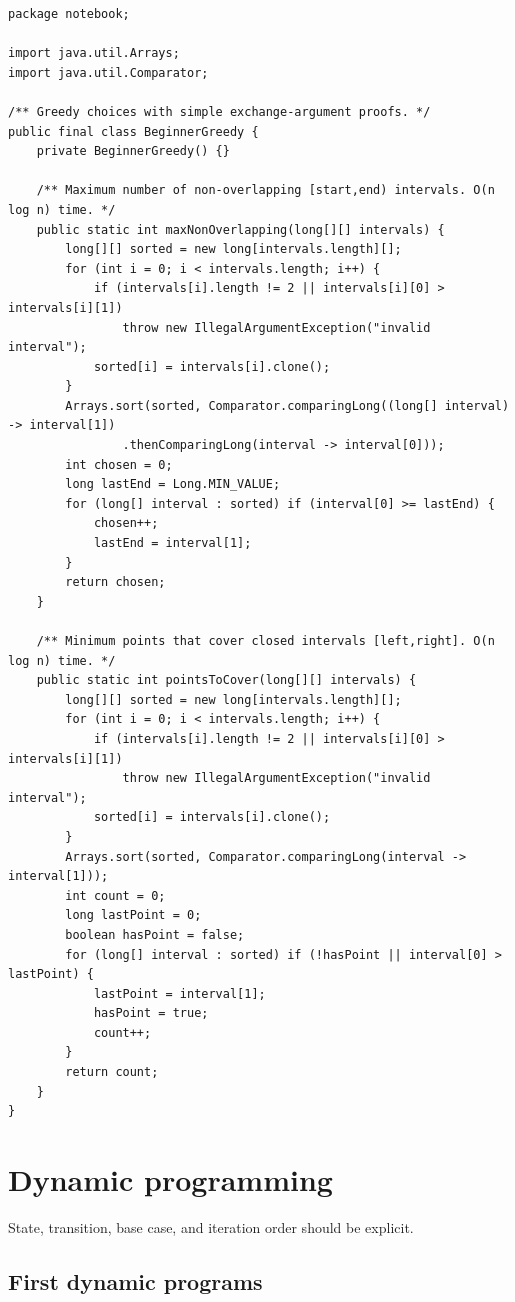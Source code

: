 \documentclass[10pt,letterpaper]{article}
\begin{document}
\begin{lstlisting}
package notebook;

import java.util.Arrays;
import java.util.Comparator;

/** Greedy choices with simple exchange-argument proofs. */
public final class BeginnerGreedy {
    private BeginnerGreedy() {}

    /** Maximum number of non-overlapping [start,end) intervals. O(n log n) time. */
    public static int maxNonOverlapping(long[][] intervals) {
        long[][] sorted = new long[intervals.length][];
        for (int i = 0; i < intervals.length; i++) {
            if (intervals[i].length != 2 || intervals[i][0] > intervals[i][1])
                throw new IllegalArgumentException("invalid interval");
            sorted[i] = intervals[i].clone();
        }
        Arrays.sort(sorted, Comparator.comparingLong((long[] interval) -> interval[1])
                .thenComparingLong(interval -> interval[0]));
        int chosen = 0;
        long lastEnd = Long.MIN_VALUE;
        for (long[] interval : sorted) if (interval[0] >= lastEnd) {
            chosen++;
            lastEnd = interval[1];
        }
        return chosen;
    }

    /** Minimum points that cover closed intervals [left,right]. O(n log n) time. */
    public static int pointsToCover(long[][] intervals) {
        long[][] sorted = new long[intervals.length][];
        for (int i = 0; i < intervals.length; i++) {
            if (intervals[i].length != 2 || intervals[i][0] > intervals[i][1])
                throw new IllegalArgumentException("invalid interval");
            sorted[i] = intervals[i].clone();
        }
        Arrays.sort(sorted, Comparator.comparingLong(interval -> interval[1]));
        int count = 0;
        long lastPoint = 0;
        boolean hasPoint = false;
        for (long[] interval : sorted) if (!hasPoint || interval[0] > lastPoint) {
            lastPoint = interval[1];
            hasPoint = true;
            count++;
        }
        return count;
    }
}
\end{lstlisting}
\section{Dynamic programming}
\begin{guidebox}State, transition, base case, and iteration order should be explicit.\end{guidebox}
\subsection{First dynamic programs}
\end{document}
